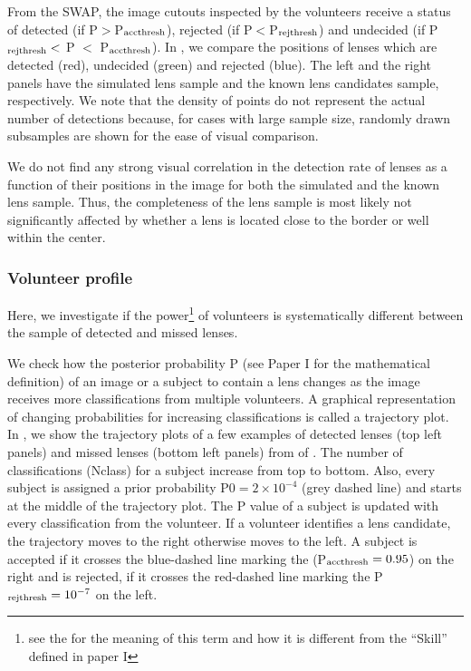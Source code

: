 \documentclass[useAMS,usenatbib,a4paper]{mn2e}
\begin{document}
From the SWAP, the image cutouts inspected by the \sw volunteers receive
a status of detected (if P$>$P$_{\rm acc thresh}$), rejected (if
P$<$P$_{\rm rej thresh}$) and undecided (if P$_{\rm rej thresh}<$ P $<$
P$_{\rm acc thresh}$). In , we compare the positions
of lenses which are detected (red), undecided (green) and rejected
(blue). The left and the right panels have the simulated lens sample and
the known lens candidates sample, respectively. We note that the density
of points do not represent the actual number of detections because, for
cases with large sample size, randomly drawn subsamples are shown for
the ease of visual comparison.

We do not find any strong visual correlation in the detection rate of
lenses as a function of their positions in the image for both the
simulated and the known lens sample. Thus, the completeness of the lens
sample is most likely not significantly affected by whether a lens is
located close to the border or well within the center.

\subsubsection{Volunteer profile}

Here, we investigate if the power\footnote{see the
 for the meaning of this term and how it is
different from the ``Skill'' defined in paper I} of volunteers is systematically
different between the sample of detected and missed lenses.

We check how the posterior probability P (see Paper I for the
mathematical definition) of an image or a subject to contain a lens
changes as the image receives more classifications from multiple
volunteers. A graphical representation of changing probabilities for
increasing classifications is called a trajectory plot. In
, we show the trajectory plots of a few examples of
detected lenses (top left panels) and missed lenses (bottom left panels)
from \StageOne of \sw. The number of classifications (Nclass) for a
subject increase from top to bottom.  Also, every subject is assigned a
prior probability P0$=2\times10^{-4}$ (grey dashed line) and starts at
the middle of the trajectory plot. The P value of a subject is updated
with every classification from the volunteer.  If a volunteer identifies
a lens candidate, the trajectory moves to the right otherwise moves to
the left. A subject is accepted if it crosses the blue-dashed line
marking the (P$_{\rm acc thresh}=0.95$) on the right and is rejected, if
it crosses the red-dashed line marking the P$_{\rm rej thresh}=10^{-7}$
on the left.
\end{document}
